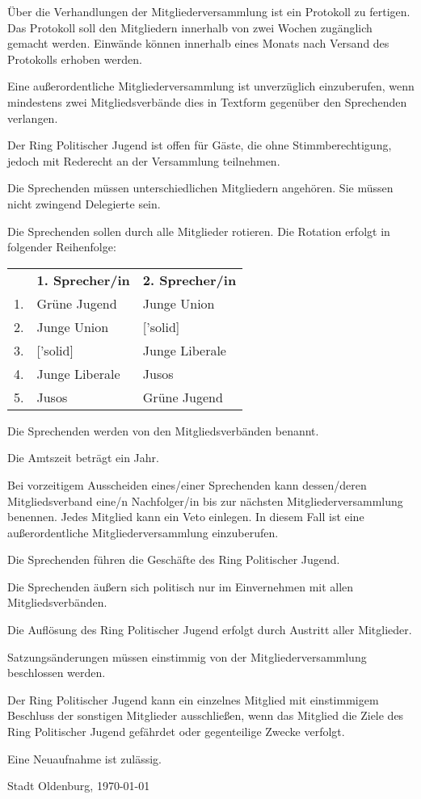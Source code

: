 \documentclass[10pt,a4paper,oneside,parskip=half]{scrartcl}
\begin{document}
\begin{contract}
Über die Verhandlungen der Mitgliederversammlung ist ein Protokoll zu fertigen. Das Protokoll soll den Mitgliedern innerhalb von zwei Wochen zugänglich gemacht werden. Einwände können innerhalb eines Monats nach Versand des Protokolls erhoben werden.

Eine außerordentliche Mitgliederversammlung ist unverzüglich einzuberufen, wenn mindestens zwei Mitgliedsverbände dies in Textform gegenüber den Sprechenden verlangen.

Der Ring Politischer Jugend ist offen für Gäste, die ohne Stimmberechtigung, jedoch mit Rederecht an der Versammlung teilnehmen.

Die Sprechenden müssen unterschiedlichen Mitgliedern angehören. Sie müssen nicht zwingend Delegierte sein.

Die Sprechenden sollen durch alle Mitglieder rotieren. Die Rotation erfolgt in folgender Reihenfolge:
\begin{tabu} to \textwidth {l X X}
& \textbf{1. Sprecher/in} & \textbf{2. Sprecher/in} \\
1. & Grüne Jugend & Junge Union \\
2. & Junge Union & ['solid] \\
3. & ['solid] & Junge Liberale \\
4. & Junge Liberale & Jusos \\
5. & Jusos & Grüne Jugend \\
\end{tabu}

Die Sprechenden werden von den Mitgliedsverbänden benannt.

Die Amtszeit beträgt ein Jahr.

Bei vorzeitigem Ausscheiden eines/einer Sprechenden kann dessen/deren Mitgliedsverband eine/n Nachfolger/in bis zur nächsten Mitgliederversammlung benennen. Jedes Mitglied kann ein Veto einlegen. In diesem Fall ist eine außerordentliche Mitgliederversammlung einzuberufen.

Die Sprechenden führen die Geschäfte des Ring Politischer Jugend.

Die Sprechenden äußern sich politisch nur im Einvernehmen mit allen Mitgliedsverbänden.

Die Auflösung des Ring Politischer Jugend erfolgt durch Austritt aller Mitglieder.

Satzungsänderungen müssen einstimmig von der Mitgliederversammlung beschlossen werden.

Der Ring Politischer Jugend kann ein einzelnes Mitglied mit einstimmigem Beschluss der sonstigen Mitglieder ausschließen, wenn das Mitglied die Ziele des Ring Politischer Jugend gefährdet oder gegenteilige Zwecke verfolgt.

Eine Neuaufnahme ist zulässig.

\end{contract}
\vspace{1cm}
Stadt Oldenburg, \today
\end{document}
